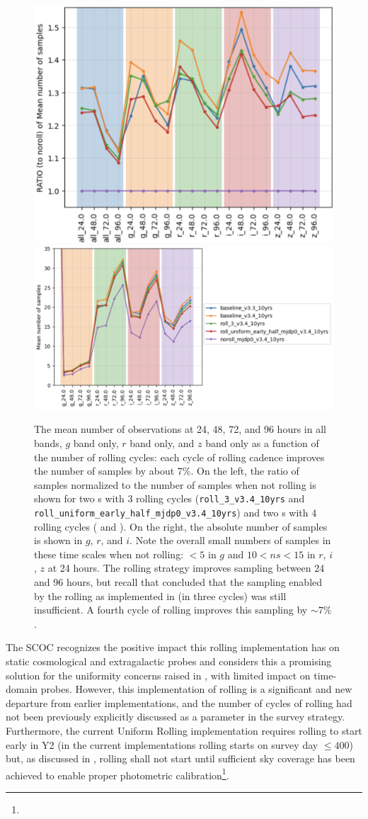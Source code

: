 \begin{figure}
    \centering
    \includegraphics[width=0.4\linewidth]{figures/rolling_sampling.png}\includegraphics[width=0.58\linewidth]{figures/rolling_nsamples.png}
    \caption{The mean number of observations at 24, 48, 72, and 96 hours in all bands, $g$ band only, $r$ band only, and $z$ band only as a function of the number of rolling cycles: each cycle of rolling cadence improves the number of samples by about 7\%. On the left, the ratio of samples normalized to the number of samples when not rolling is shown for two \opsim s with 3 rolling cycles (\texttt{roll\_3\_v3.4\_10yrs} and \texttt{roll\_uniform\_early\_half\_mjdp0\_v3.4\_10yrs}) and two \opsim s with 4 rolling cycles ( and ). On the right, the absolute number of samples is shown in $g$, $r$, and $i$. Note the overall small numbers of samples in these time scales when not rolling: $<5$ in $g$ and  $10<ns< 15$ in $r$, $i$, $z$ at 24 hours. The rolling strategy improves sampling between 24 and 96 hours, but recall that  concluded that the sampling enabled by the rolling as implemented in  (in three cycles) was still insufficient. A fourth cycle of rolling improves this sampling by $\sim7\%$.}
    \label{fig:rolling_sampling}
\end{figure}

The SCOC recognizes the positive impact this rolling implementation has on static cosmological and extragalactic probes and considers this a promising solution for the uniformity concerns raised in , with limited impact on time-domain probes. However, this implementation of rolling is a significant and new departure from earlier implementations, and the number of cycles of rolling had not been previously explicitly discussed as a parameter in the survey strategy. Furthermore, the current Uniform Rolling implementation requires rolling to start early in Y2 (in the current implementations rolling starts on survey day $\leq 400$) but, as discussed in , rolling shall not start until sufficient sky coverage has been achieved to enable proper photometric calibration\footnote{}. 

